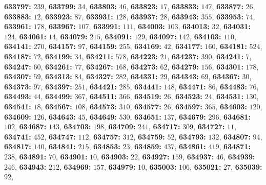 \textsf{\bfseries 633797:} $239$, \textsf{\bfseries 633799:} $34$, \textsf{\bfseries 633803:} $46$, \textsf{\bfseries 633823:} $17$, \textsf{\bfseries 633833:} $147$, \textsf{\bfseries 633877:} $26$, \textsf{\bfseries 633883:} $12$, \textsf{\bfseries 633923:} $87$, \textsf{\bfseries 633931:} $128$, \textsf{\bfseries 633937:} $28$, \textsf{\bfseries 633943:} $355$, \textsf{\bfseries 633953:} $74$, \textsf{\bfseries 633961:} $178$, \textsf{\bfseries 633967:} $107$, \textsf{\bfseries 633991:} $111$, \textsf{\bfseries 634003:} $103$, \textsf{\bfseries 634013:} $32$, \textsf{\bfseries 634031:} $124$, \textsf{\bfseries 634061:} $14$, \textsf{\bfseries 634079:} $215$, \textsf{\bfseries 634091:} $129$, \textsf{\bfseries 634097:} $142$, \textsf{\bfseries 634103:} $110$, \textsf{\bfseries 634141:} $270$, \textsf{\bfseries 634157:} $97$, \textsf{\bfseries 634159:} $255$, \textsf{\bfseries 634169:} $42$, \textsf{\bfseries 634177:} $160$, \textsf{\bfseries 634181:} $524$, \textsf{\bfseries 634187:} $72$, \textsf{\bfseries 634199:} $34$, \textsf{\bfseries 634211:} $578$, \textsf{\bfseries 634223:} $21$, \textsf{\bfseries 634237:} $390$, \textsf{\bfseries 634241:} $7$, \textsf{\bfseries 634247:} $60$, \textsf{\bfseries 634261:} $77$, \textsf{\bfseries 634267:} $168$, \textsf{\bfseries 634273:} $62$, \textsf{\bfseries 634279:} $156$, \textsf{\bfseries 634301:} $178$, \textsf{\bfseries 634307:} $59$, \textsf{\bfseries 634313:} $84$, \textsf{\bfseries 634327:} $282$, \textsf{\bfseries 634331:} $29$, \textsf{\bfseries 634343:} $69$, \textsf{\bfseries 634367:} $30$, \textsf{\bfseries 634373:} $97$, \textsf{\bfseries 634397:} $251$, \textsf{\bfseries 634421:} $285$, \textsf{\bfseries 634441:} $148$, \textsf{\bfseries 634471:} $86$, \textsf{\bfseries 634483:} $76$, \textsf{\bfseries 634493:} $44$, \textsf{\bfseries 634499:} $367$, \textsf{\bfseries 634511:} $366$, \textsf{\bfseries 634519:} $26$, \textsf{\bfseries 634523:} $24$, \textsf{\bfseries 634531:} $130$, \textsf{\bfseries 634541:} $18$, \textsf{\bfseries 634567:} $108$, \textsf{\bfseries 634573:} $310$, \textsf{\bfseries 634577:} $26$, \textsf{\bfseries 634597:} $365$, \textsf{\bfseries 634603:} $120$, \textsf{\bfseries 634609:} $126$, \textsf{\bfseries 634643:} $45$, \textsf{\bfseries 634649:} $530$, \textsf{\bfseries 634651:} $137$, \textsf{\bfseries 634679:} $296$, \textsf{\bfseries 634681:} $102$, \textsf{\bfseries 634687:} $143$, \textsf{\bfseries 634703:} $198$, \textsf{\bfseries 634709:} $241$, \textsf{\bfseries 634717:} $309$, \textsf{\bfseries 634727:} $11$, \textsf{\bfseries 634741:} $452$, \textsf{\bfseries 634747:} $112$, \textsf{\bfseries 634757:} $312$, \textsf{\bfseries 634759:} $52$, \textsf{\bfseries 634793:} $132$, \textsf{\bfseries 634807:} $94$, \textsf{\bfseries 634817:} $140$, \textsf{\bfseries 634841:} $215$, \textsf{\bfseries 634853:} $23$, \textsf{\bfseries 634859:} $437$, \textsf{\bfseries 634861:} $419$, \textsf{\bfseries 634871:} $238$, \textsf{\bfseries 634891:} $70$, \textsf{\bfseries 634901:} $10$, \textsf{\bfseries 634903:} $22$, \textsf{\bfseries 634927:} $159$, \textsf{\bfseries 634937:} $46$, \textsf{\bfseries 634939:} $246$, \textsf{\bfseries 634943:} $212$, \textsf{\bfseries 634969:} $157$, \textsf{\bfseries 634979:} $10$, \textsf{\bfseries 635003:} $106$, \textsf{\bfseries 635021:} $27$, \textsf{\bfseries 635039:} $92$, 
